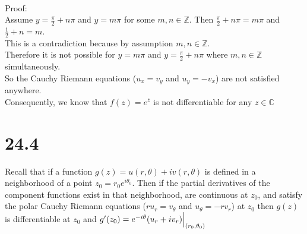 \documentclass{article}
\begin{document}
\begin{center}
    \\Proof:
    \\Assume $y =\frac{\pi}{2} + n\pi$ and $y = m\pi$ for some $m, n\in\mathbb{Z}$. Then $\frac{\pi}{2} + n\pi = m\pi$ and $\frac{1}{2} + n = m$.
    \\This is a contradiction because by assumption $m, n\in\mathbb{Z}$.
    \\Therefore it is not possible for $y = m\pi$ and $y =\frac{\pi}{2} + n\pi$ where $m, n\in\mathbb{Z}$ simultaneously.
    \break
    \\So the Cauchy Riemann equations ($u_x = v_y$ and $u_y = -v_x$) are not satisfied anywhere.
    \\Consequently, we know that $f(z) = e^{\overline{z}}$ is not differentiable for any $z\in\mathbb{C}$ \qedsymbol
\end{center}


\newpage
\section*{24.4}
\begin{center}
    \doublespacing
    Recall that if a function $g(z) = u(r,\theta) + iv(r,\theta)$ is defined in a neighborhood of a point $z_0 = r_0 e^{i\theta_0}$. Then if the partial derivatives of the component functions exist in that neighborhood, are continuous at $z_0$, and satisfy the polar Cauchy Riemann equations ($r u_r = v_\theta$ and $u_\theta = -r v_r$) at $z_0$ then $g(z)$ is differentiable at $z_0$ and $g'(z_0) = e^{-i\theta} (u_r + iv_r)\Big{|}_{(r_0,\theta_0)}$
\end{center}
\end{document}
